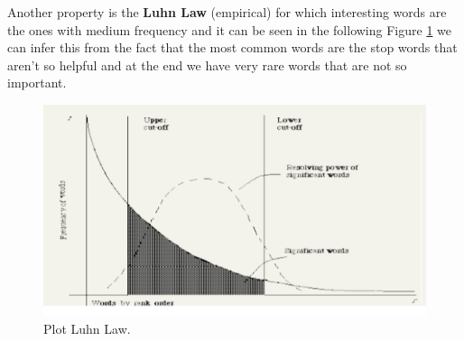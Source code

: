Another property is the \textbf{Luhn Law} (empirical) for which interesting words are the ones with medium frequency and it can be seen in the following Figure \ref{fig:luhnlawplot} we can infer this from the fact that the most common words are the stop words that aren't so helpful and at the end we have very rare words that are not so important.
\begin{figure}
    \centering
    \includegraphics[width=0.75\linewidth]{images/luhnlaw.png}
    \caption{Plot Luhn Law.}
    \label{fig:luhnlawplot}
\end{figure}
